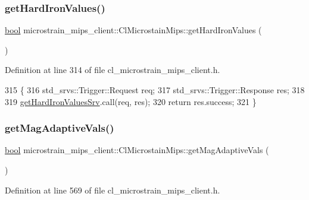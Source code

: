 \subsubsection{\texorpdfstring{get\+Hard\+Iron\+Values()}{getHardIronValues()}}
{\footnotesize\ttfamily \hyperlink{classbool}{bool} microstrain\+\_\+mips\+\_\+client\+::\+Cl\+Microstain\+Mips\+::get\+Hard\+Iron\+Values (\begin{DoxyParamCaption}{ }\end{DoxyParamCaption})\hspace{0.3cm}{\ttfamily [inline]}}



Definition at line 314 of file cl\+\_\+microstrain\+\_\+mips\+\_\+client.\+h.


\begin{DoxyCode}
315     \{
316         std\_srvs::Trigger::Request req;
317         std\_srvs::Trigger::Response res;
318 
319         \hyperlink{classmicrostrain__mips__client_1_1ClMicrostainMips_a712c957de40a04e2b546135b6ce63921}{getHardIronValuesSrv}.call(req, res);
320         \textcolor{keywordflow}{return} res.success;
321     \}
\end{DoxyCode}
\mbox{\label{classmicrostrain__mips__client_1_1ClMicrostainMips_a8e2d2133e1ddee47ed32e65e1404e050}} 
\subsubsection{\texorpdfstring{get\+Mag\+Adaptive\+Vals()}{getMagAdaptiveVals()}}
{\footnotesize\ttfamily \hyperlink{classbool}{bool} microstrain\+\_\+mips\+\_\+client\+::\+Cl\+Microstain\+Mips\+::get\+Mag\+Adaptive\+Vals (\begin{DoxyParamCaption}{ }\end{DoxyParamCaption})\hspace{0.3cm}{\ttfamily [inline]}}



Definition at line 569 of file cl\+\_\+microstrain\+\_\+mips\+\_\+client.\+h.


